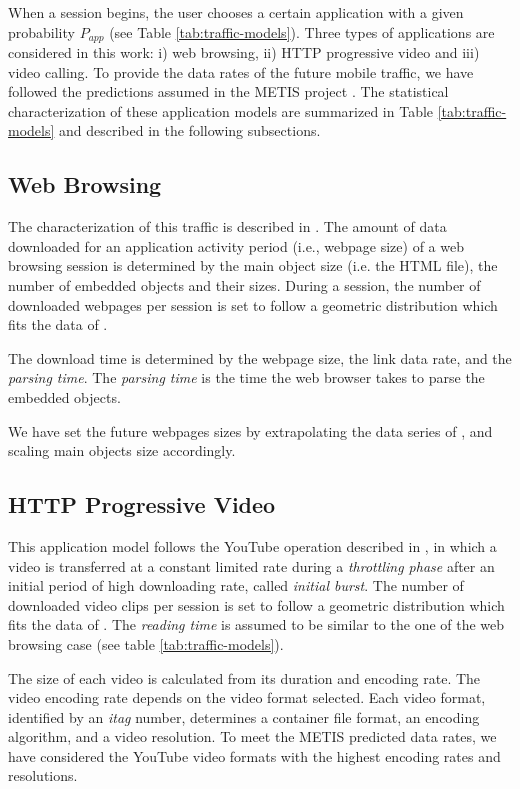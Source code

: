 \documentclass[conference]{IEEEtran}
\begin{document}
When a session begins, the user chooses a certain application with a given probability $P_{app}$ (see Table \ref{tab:traffic-models}). Three types of applications are considered in this work: i) web browsing, ii) HTTP progressive video and iii) video calling. To provide the data rates of the future mobile traffic, we have followed the predictions assumed in the METIS project \cite{metis}. The statistical characterization of these application models are summarized in Table \ref{tab:traffic-models} and described in the following subsections.

\subsection{Web Browsing}

 The characterization of this traffic is described in \cite{ngmn08}. The amount of data downloaded for an application activity period (i.e., webpage size) of a web browsing session is determined by the main object size (i.e. the HTML file), the number of embedded objects and their sizes. During a session, the number of downloaded webpages per session is set to follow a geometric distribution which fits the data of \cite{Gou11}.

 The download time is determined by the webpage size, the link data rate, and the \emph{parsing time}. The \emph{parsing time} is the time  the web browser takes to parse the embedded objects. 

 We have set the future webpages sizes by extrapolating the data series of \cite{httpArchive}, and scaling main objects size accordingly. 
 
\subsection{HTTP Progressive Video}

 This application model follows the YouTube operation described in \cite{Ameigeiras12}, in which a video is transferred at a constant limited rate during a \emph{throttling phase} after an initial period of high downloading rate, called \emph{initial burst}. The number of downloaded video clips per session is set to follow a geometric distribution which fits the data of \cite{Phillipa08}.  The \emph{reading time} is assumed to be similar to the one of the web browsing case (see table \ref{tab:traffic-models}). 
 
 The size of each video is calculated from its duration and encoding rate. The video encoding rate depends on the video format selected. Each video format, identified by an \emph{itag} number, determines a container file format, an encoding algorithm, and a video resolution. To meet the METIS predicted data rates, we have considered the YouTube video formats with the highest encoding rates and resolutions.  
 
\end{document}

